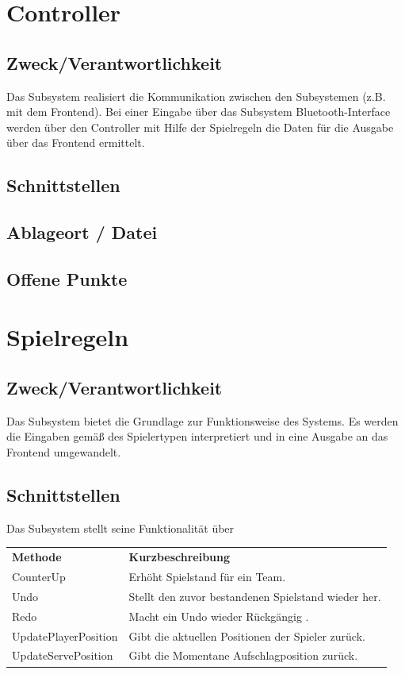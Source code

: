 \section{Controller}
\subsection*{Zweck/Verantwortlichkeit}
Das Subsystem realisiert die Kommunikation zwischen den Subsystemen (z.B. mit dem Frontend). Bei einer Eingabe über das Subsystem Bluetooth-Interface werden über den Controller mit Hilfe der Spielregeln die Daten für die Ausgabe über das Frontend ermittelt.
\subsection*{Schnittstellen}
\subsection*{Ablageort / Datei}
\subsection*{Offene Punkte}

\section{Spielregeln}
\subsection*{Zweck/Verantwortlichkeit}
Das Subsystem bietet die Grundlage zur Funktionsweise des Systems. Es werden die Eingaben gemäß des Spielertypen interpretiert und in eine Ausgabe an das Frontend umgewandelt.
\subsection*{Schnittstellen}
Das Subsystem stellt seine Funktionalität über 
\begin{center}
\begin{tabular}[h]{|l|l|}
\cline{1-2}
\textbf{Methode} & \textbf{Kurzbeschreibung}\\
\cline{1-2}
CounterUp & Erhöht Spielstand für ein Team.\\ 
\cline{1-2}
Undo & Stellt den zuvor bestandenen Spielstand wieder her.\\
\cline{1-2}
Redo & Macht ein Undo wieder Rückgängig .\\
\cline{1-2}
UpdatePlayerPosition & Gibt die aktuellen Positionen der Spieler zurück.\\
\cline{1-2} 
UpdateServePosition & Gibt die Momentane Aufschlagposition zurück.\\
\cline{1-2}
\end{tabular}
\end{center}
